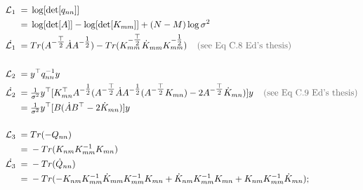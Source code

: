 \documentclass{article}
\newcommand{\inv}{^{-1}}
\newcommand{\T}{^{\top}}
\newcommand{\nsqt}{^{-\tfrac{\top}{2}}}
\newcommand{\nsq}{^{-\tfrac{1}{2}}}
\newcommand{\llik}{{\mathcal{L}}}
\newcommand{\grey}[1]{\textcolor{grey}{#1}}
\begin{document}
\begin{equation}
\begin{split}
\llik_1 \;=&\; \log[\det[q_{nn}]] \\
        \;=&\; \log[\det[A]] - \log[\det[K_{mm}]] + (N-M)\log \sigma^2 \\
\dot{\llik_1} \;=&\; Tr(A\nsqt \dot{A} A\nsq) - Tr(K_{mm}\nsqt \dot{K}_{mm} K_{mm}\nsq) \grey{\;\;\;\; \text{(see Eq C.8 Ed's thesis)}} \\
        \; &\; \\
\llik_2 \;=&\; y\T q_{nn}\inv y \\
\dot{\llik_2} \;=&\; \tfrac{1}{\sigma^{2}} y\T [ K_{mn}\T A\nsq (A\nsqt \dot{A} A\nsq (A\nsqt K_{mn} ) - 2A\nsqt \dot{K}_{mn})] y \grey{\;\;\;\; \text{(see Eq C.9 Ed's thesis)}} \\
              \;=&\; \tfrac{1}{\sigma^{2}} y\T [ B ( \dot{A} B\T - 2 \dot{K}_{mn})] y \\
 \; &\; \\
\llik_3 \;=&\; Tr(-Q_{nn}) \\
        \;=&\; -Tr(K_{nm}K_{mm}\inv K_{mn}) \\
\dot{\llik_3} \;=&\; -Tr(\dot{Q}_{nn}) \\
              \;=&\; -Tr(-K_{nm} K_{mm}\inv \dot{K}_{mm} K_{mm}\inv K_{mn} + \dot{K}_{nm} K_{mm}\inv K_{mn} + K_{nm} K_{mm}\inv \dot{K}_{mn});
\end{split} 
\end{equation}
\end{document}
